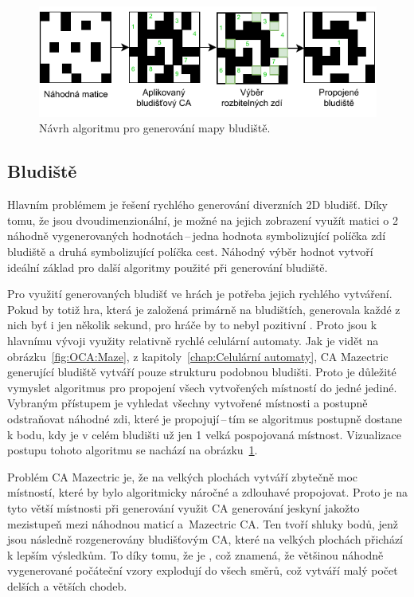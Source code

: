 \begin{figure}[h]
    \centering
    \vspace{0.3cm}
    \includegraphics[width=\textwidth]{obrazky-figures/ch3/algoritmus_generovani_mapy.pdf}
    \caption{Návrh algoritmu pro generování mapy bludiště.}
    \label{fig:algoritmus_generovani_mapy}
\end{figure}

\subsection*{Bludiště}
Hlavním problémem je řešení rychlého generování diverzních 2D bludišť. Díky tomu, že jsou dvoudimenzionální, je možné na jejich zobrazení využít matici o 2 náhodně vygenerovaných hodnotách\,--\,jedna hodnota symbolizující políčka zdí bludiště a druhá symbolizující políčka cest. Náhodný výběr hodnot vytvoří ideální základ pro další algoritmy použité při generování bludiště.

Pro využití generovaných bludišť ve hrách je potřeba jejich rychlého vytváření. Pokud by totiž hra, která je založená primárně na bludištích, generovala každé z nich byť i jen několik sekund, pro hráče by to nebyl pozitivní . Proto jsou k hlavnímu vývoji využity relativně rychlé celulární automaty. Jak je vidět na obrázku~\ref{fig:OCA:Maze}, z kapitoly~\ref{chap:Celulární automaty}, CA Mazectric generující bludiště vytváří pouze strukturu podobnou bludišti. Proto je důležité vymyslet algoritmus pro propojení všech vytvořených místností do jedné jediné. Vybraným přístupem je vyhledat všechny vytvořené místnosti a postupně odstraňovat náhodné zdi, které je propojují\,--\,tím se algoritmus postupně dostane k bodu, kdy je v celém bludišti už jen 1 velká pospojovaná místnost. Vizualizace postupu tohoto algoritmu se nachází na obrázku~\ref{fig:algoritmus_generovani_mapy}.

Problém CA Mazectric je, že na velkých plochách vytváří zbytečně moc místností, které by bylo algoritmicky náročné a zdlouhavé propojovat. Proto je na tyto větší místnosti při generování využit CA generování jeskyní jakožto mezistupeň mezi náhodnou maticí a~Mazectric CA. Ten tvoří shluky bodů, jenž jsou následně rozgenerovány bludišťovým CA, které na velkých plochách přichází k lepším výsledkům. To díky tomu, že je , což znamená, že většinou náhodně
vygenerované počáteční vzory explodují do všech směrů, což vytváří malý počet delších a větších chodeb.

